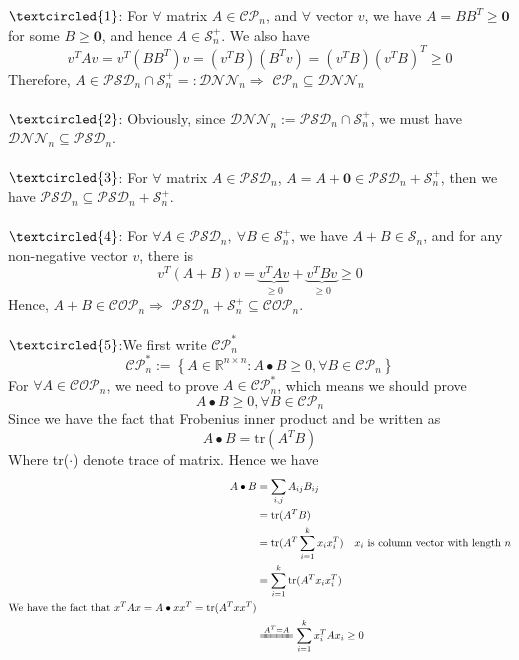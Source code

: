 \documentclass[11pt,a4paper]{article}
\begin{document}
$\textcircled{1}$: For $\forall$ matrix $A\in\mathcal{CP}_{n}$, and $\forall$ vector $v$, we have $A=B B^{T}\geq\mathbf{0}$ for some $B \geq \mathbf{0}$, and hence $A\in\mathcal{S}_{n}^{+}$. We also have $$v^{T}Av=v^{T}(BB^{T})v=(v^{T}B)(B^{T}v)=(v^{T}B)(v^{T}B)^{T}\geq0$$Therefore, $A\in\mathcal{PSD}_{n}\cap \mathcal{S}_{n}^{+}=:\mathcal{DNN}_{n}\Rightarrow$ $\mathcal{C} \mathcal{P}_{n} \subseteq \mathcal{D} \mathcal{N} \mathcal{N}_{n}$\\ \\ 
$\textcircled{2}$: Obviously, since $\mathcal{D} \mathcal{N} \mathcal{N}_{n}:=\mathcal{P} \mathcal{S} \mathcal{D}_{n} \cap \mathcal{S}_{n}^{+}$, we must have $\mathcal{D} \mathcal{N} \mathcal{N}_{n} \subseteq \mathcal{P} \mathcal{S} \mathcal{D}_{n}.$\\ \\
$\textcircled{3}$: For $\forall$ matrix $A\in \mathcal{PSD}_{n}$, $A=A+\mathbf{0}\in \mathcal{P S D}_{n}+\mathcal{S}_{n}^{+}$, then we have $\mathcal{P S} \mathcal{D}_{n} \subseteq \mathcal{P} \mathcal{S} \mathcal{D}_{n}+\mathcal{S}_{n}^{+}$.\\ \\
$\textcircled{4}$: For $\forall A\in\mathcal{P S D}_{n},\ \forall B\in\mathcal{S}_{n}^{+}$, we have $A+B\in \mathcal{S}_{n}$, and for any non-negative vector $v$, there is $$v^{T}(A+B)v=\underbrace{v^{T}Av}_{\geq 0}+\underbrace{v^{T}Bv}_{\geq0}\geq0$$
Hence, $A+B\in \mathcal{C O P}_{n}\Rightarrow$ $\mathcal{P S D}_{n}+\mathcal{S}_{n}^{+} \subseteq \mathcal{C O P}_{n}$.\\ \\
$\textcircled{5}$:We first write $\mathcal{C} \mathcal{P}_{n}^{*}$
$$\mathcal{C} \mathcal{P}_{n}^{*}:=\left\{  A\in \mathbb{R}^{n \times n} : A \bullet B\geq 0, \forall B\in \mathcal{C P}_{n}  \right\}$$
For $\forall A\in \mathcal{C O P}_{n}$, we need to prove $A\in\mathcal{C P}^{*}_{n}$, which means we should prove $$A \bullet B\geq 0, \forall B\in \mathcal{C P}_{n} $$ Since we have the fact that Frobenius inner product and be written as $$A\bullet B = \mathrm{tr}(A^{T}B)$$
Where tr($\cdot$) denote trace of matrix. Hence we have 
$$\begin{aligned}
A\bullet B &= \sum_{i,j}A_{ij}B_{ij}\\ &=\mathrm{tr}(A^{T}B)\\
&=\mathrm{tr}(A^{T}\sum_{i=1}^{k}x_{i}x_{i}^{T}) \quad x_{i}\text{ is column vector with length }n \\
&=\sum_{i=1}^{k}\mathrm{tr}(A^{T}x_{i}x_{i}^{T})\\
\text{We have the fact that $x^{T}Ax=A\bullet xx^{T}=\mathrm{tr}(A^{T}xx^{T})$}\\
&\xlongequal{A^{T}=A}\sum_{i=1}^{k}x_{i}^{T}Ax_{i}\geq0
\end{aligned}$$
\end{document}
